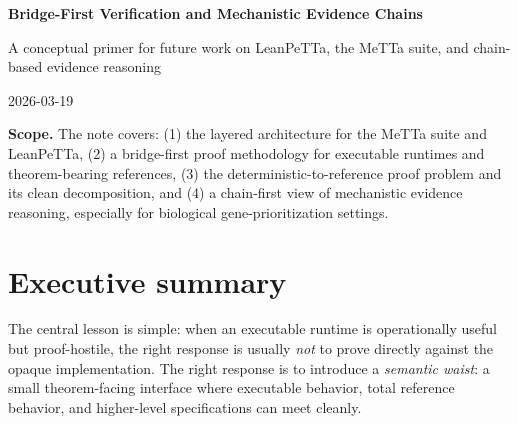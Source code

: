 \documentclass[11pt]{article}
\newcommand{\term}[1]{\emph{#1}}
\begin{document}
\begin{titlepage}
\centering
\vspace*{2.0cm}
{\fontsize{20}{24}\selectfont\bfseries\color{accent} Bridge-First Verification and Mechanistic Evidence Chains\par}
\vspace{0.5cm}
{\fontsize{12}{15}\selectfont A conceptual primer for future work on LeanPeTTa, the MeTTa suite, and chain-based evidence reasoning\par}
\vspace{0.8cm}
{\large 2026-03-19\par}
\vspace{1.0cm}
\vfill
\begin{minipage}{0.9\textwidth}
\small
\textbf{Scope.} The note covers: (1) the layered architecture for the MeTTa suite and LeanPeTTa, (2) a bridge-first proof methodology for executable runtimes and theorem-bearing references, (3) the deterministic-to-reference proof problem and its clean decomposition, and (4) a chain-first view of mechanistic evidence reasoning, especially for biological gene-prioritization settings.\par
\end{minipage}
\vspace*{1.3cm}
\end{titlepage}

\tableofcontents
\newpage

\section{Executive summary}

The central lesson is simple: when an executable runtime is operationally useful but proof-hostile, the right response is usually \term{not} to prove directly against the opaque implementation. The right response is to introduce a \term{semantic waist}: a small theorem-facing interface where executable behavior, total reference behavior, and higher-level specifications can meet cleanly.
\end{document}
